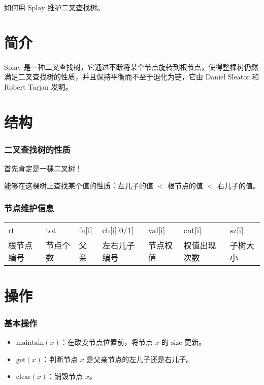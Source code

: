 
\begin{QUOTE}{}{}
如何用 $\text{Splay}$ 维护二叉查找树。
\end{QUOTE}

\hr

\section{简介}

$\text{Splay}$ 是一种二叉查找树，它通过不断将某个节点旋转到根节点，使得整棵树仍然满足二叉查找树的性质，并且保持平衡而不至于退化为链，它由 Daniel Sleator 和 Robert Tarjan 发明。

\hr

\section{结构}

\subsubsection{二叉查找树的性质}

首先肯定是一棵二叉树！

能够在这棵树上查找某个值的性质：左儿子的值 $<$ 根节点的值 $<$ 右儿子的值。

\subsubsection{节点维护信息}

\begin{tabular}{lllllll}
\hline
rt& tot& fa[i]& ch[i][0/1]& val[i]& cnt[i]& sz[i]\\根节点编号& 节点个数& 父亲& 左右儿子编号& 节点权值& 权值出现次数& 子树大小\\\hline
\end{tabular}

\hr

\section{操作}

\subsubsection{基本操作}

\begin{itemize}
\item $\text{maintain}(x)$：在改变节点位置前，将节点 $x$ 的 $\text{size}$ 更新。
\item $\text{get}(x)$：判断节点 $x$ 是父亲节点的左儿子还是右儿子。
\item $\text{clear}(x)$：销毁节点 $x$。
\end{itemize}


